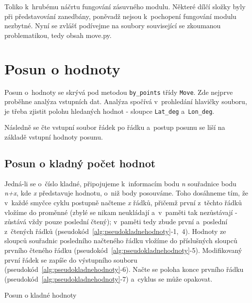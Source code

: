 Toliko k~hrubému náčrtu fungování zásuvného modulu. Některé dílčí složky byly při představování
zane\-dbány, poněvadž nejsou k~pochopení fungování mo\-dulu nezbytné. Nyní se zvlášť podívejme na
soubory související se zkoumanou pro\-blematikou, tedy obsah move.py. 


\section{Posun o hodnoty}
\label{by_points}

Posun o~hodnoty se skrývá pod metodou {\tt by\_points} třídy {\tt Move}.
Zde nejprve proběhne analýza vstupních dat.
Analýza spočívá v~prohledání hlavičky souboru, je třeba zjistit polohu hledaných hodnot - sloupce
{\tt Lat\_deg} a~{\tt Lon\_deg}. 

Následně se čte vstupní soubor řádek po řádku a~postup posunu se liší na základě vstupní hodnoty posunu. 

\subsection{Posun o kladný počet hodnot}
\label{kladnehodnoty}

Jedná-li se o~číslo kladné, připojujeme k~informacím bodu \textit{n} souřadnice bodu
\textit{n+x}, kde \textit{x} představuje hodnotu, o~niž body posouváme. Toho dosáhneme tím, že
v~každé smyčce cyklu postupně načteme \textit{x} řádků, přičemž první z~těchto řádků vložíme do proměnné
(zbylé se nikam neukládají a~v~paměti tak nezůstávají - zůstává vždy pouze poslední čtený);
v~paměti tedy zbude první a~poslední z~čtených řádků
(pseudokód~\ref{alg:pseudokladnehodnoty}-1,~4). Hodnoty ze sloupců souřadnic posledního
načteného řádku vložíme do příslušných sloupců prvního čteného řádku
(pseudokód~\ref{alg:pseudokladnehodnoty}-5). Modifikovaný první
řádek se zapíše do výstupního souboru (pseudokód~\ref{alg:pseudokladnehodnoty}-6).
Načte se poloha konce prvního řádku (pseudokód~\ref{alg:pseudokladnehodnoty}-7) a~cyklus se může opakovat. 

\begin{algorithm}
    \caption{Posun o kladné hodnoty}
    \label{alg:pseudokladnehodnoty}
    \begin{algorithmic}[1]

    \ENDWHILE
    \end{algorithmic}
\end{algorithm}

